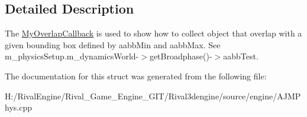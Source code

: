 \subsection{Detailed Description}
The \hyperlink{struct_my_overlap_callback}{My\+Overlap\+Callback} is used to show how to collect object that overlap with a given bounding box defined by aabb\+Min and aabb\+Max. See m\+\_\+physics\+Setup.\+m\+\_\+dynamics\+World-\/$>$get\+Broadphase()-\/$>$aabb\+Test. 

The documentation for this struct was generated from the following file\+:\begin{DoxyCompactItemize}
\item 
H\+:/\+Rival\+Engine/\+Rival\+\_\+\+Game\+\_\+\+Engine\+\_\+\+G\+I\+T/\+Rival3dengine/source/engine/A\+J\+M\+Phys.\+cpp\end{DoxyCompactItemize}
